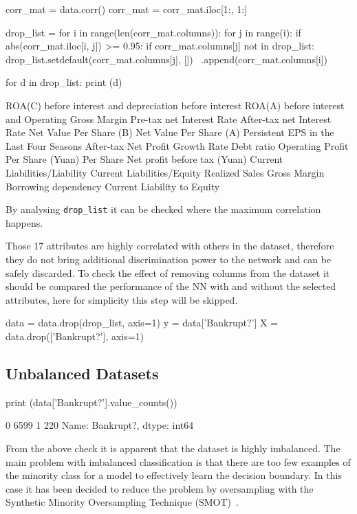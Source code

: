 \begin{ipython}
corr_mat = data.corr()
corr_mat = corr_mat.iloc[1:, 1:]
	
drop_list = {}
for i in range(len(corr_mat.columns)):
    for j in range(i):
        if abs(corr_mat.iloc[i, j]) >= 0.95:
            if corr_mat.columns[j] not in drop_list:
                drop_list.setdefault(corr_mat.columns[j], []) \
                    .append(corr_mat.columns[i])

for d in drop_list:
    print (d)
\end{ipython}
\begin{ioutput}
ROA(C) before interest and depreciation before interest
ROA(A) before interest and %
Operating Gross Margin
Pre-tax net Interest Rate
After-tax net Interest Rate
Net Value Per Share (B)
Net Value Per Share (A)
Persistent EPS in the Last Four Seasons
After-tax Net Profit Growth Rate
Debt ratio %
Operating Profit Per Share (Yuan)
Per Share Net profit before tax (Yuan)
Current Liabilities/Liability
Current Liabilities/Equity
Realized Sales Gross Margin
Borrowing dependency
Current Liability to Equity
\end{ioutput}
\noindent 
By analysing \texttt{drop\_list} it can be checked where the maximum correlation happens.

Those 17 attributes are highly correlated with others in the dataset, therefore they do not bring additional discrimination power to the network and can be safely discarded. To check the effect of removing columns from the dataset it should be compared the performance of the NN with and without the selected attributes, here for simplicity this step will be skipped.

\begin{ipython}
data = data.drop(drop_list, axis=1)
y = data['Bankrupt?']
X = data.drop(['Bankrupt?'], axis=1)
\end{ipython}

\subsection{Unbalanced Datasets}

\begin{ipython}
print (data['Bankrupt?'].value_counts())
\end{ipython}
\begin{ioutput}
0    6599
1     220
Name: Bankrupt?, dtype: int64
\end{ioutput}

From the above check it is apparent that the dataset is highly imbalanced. The main problem with imbalanced classification is that there are too few examples of the minority class for a model to effectively learn the decision boundary. In this case it has been decided to reduce the problem by oversampling with the Synthetic Minority Oversampling Technique (SMOT)~\cite{bib:smot}. 


